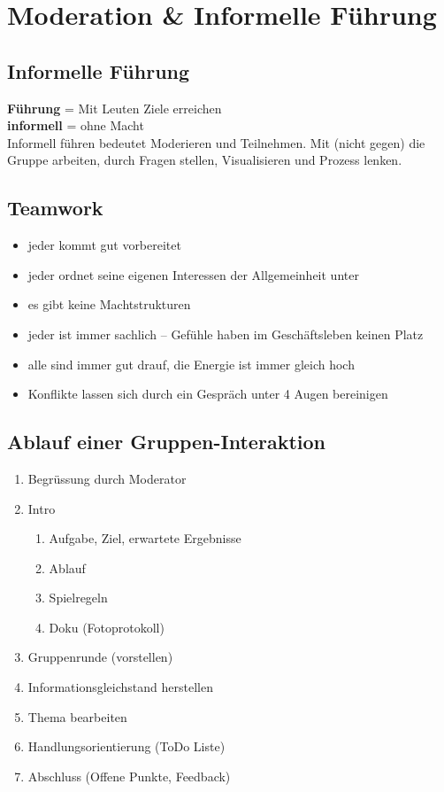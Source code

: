 \chapter{Moderation \& Informelle Führung}

\section{Informelle Führung}

\textbf{Führung} = Mit Leuten Ziele erreichen \\
\textbf{informell} = ohne Macht \\
Informell führen bedeutet Moderieren und Teilnehmen. Mit (nicht gegen) die Gruppe arbeiten, durch Fragen stellen, Visualisieren und Prozess lenken.

\section{Teamwork}

\begin{itemize}
	\item jeder kommt gut vorbereitet
	\item jeder ordnet seine eigenen Interessen der Allgemeinheit unter
	\item es gibt keine Machtstrukturen
	\item jeder ist immer sachlich -- Gefühle haben im Geschäftsleben keinen Platz
	\item alle sind immer gut drauf, die Energie ist immer gleich hoch
	\item Konflikte lassen sich durch ein Gespräch unter 4 Augen bereinigen
\end{itemize}

\section{Ablauf einer Gruppen-Interaktion}

\begin{enumerate}
	\item Begrüssung durch Moderator
	\item Intro
		\begin{enumerate}
			\item Aufgabe, Ziel, erwartete Ergebnisse
			\item Ablauf
			\item Spielregeln
			\item Doku (Fotoprotokoll)
		\end{enumerate}
	\item Gruppenrunde (vorstellen)
	\item Informationsgleichstand herstellen
	\item Thema bearbeiten
	\item Handlungsorientierung (ToDo Liste)
	\item Abschluss (Offene Punkte, Feedback)
\end{enumerate}

